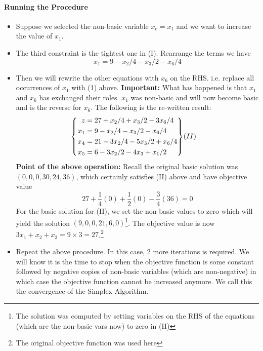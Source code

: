\documentclass[10pt]{article}
\newenvironment{rcases}
  {\left.\begin{aligned}}
  {\end{aligned}\right\rbrace}
\begin{document}
\paragraph{Running the Procedure}
\begin{itemize}
    \item Suppose we selected the non-basic variable $x_e = x_1$ and we want to increase the value of $x_1$. 
    \item The third constraint is the tightest one in (I). Rearrange the terms we have 
        \begin{equation}
            x_1 = 9 - x_2/4 - x_3/2 - x_6/4
        \end{equation}
    \item Then we will rewrite the other equations with $x_6$ on the RHS. i.e. replace all occurrences of $x_1$ with (1) above. \textbf{Important:} What has happened is that $x_1$ and $x_6$ has exchanged their roles. $x_1$ was non-basic and will now become basic and is the reverse for $x_6$. The following is the re-written result:
        \begin{equation*}
            \begin{cases}
                \begin{rcases}
                z &= 27 + x_2/4 + x_3/2 - 3x_6 /4 \\
                x_1 &= 9 - x_2/4 - x_3/2 - x_6/4 \\
                x_4 &= 21 - 3x_2/4 - 5x_3/2 +  x_6/4 \\
                x_5 &= 6 - 3x_2/2 - 4x_3 + x_1/2 
                \end{rcases}
                (II)
            \end{cases}
        \end{equation*}
    \textbf{Point of the above operation:} Recall the original basic solution was $(0,0,0,30,24,36)$, which certainly satisfies (II) above and have objective value
        \begin{equation*}
            27 + \frac{1}{4}(0) + \frac{1}{2}(0) - \frac{3}{4}(36) = 0
        \end{equation*}
    For the basic solution for (II), we set the non-basic values to zero which will yield the solution $(9,0,0,21,6,0)$\footnote{The solution was computed by setting variables on the RHS of the equations (which are the non-basic vars now) to zero in (II)}. The objective value is now $3x_1+x_2 + x_3 = 9 \times 3 = 27$.\footnote{The original objective function was used here}
    \item Repeat the above procedure. In this case, 2 more iterations is required. We will know it is the time to stop when the objective function is some constant followed by negative copies of non-basic variables (which are non-negative) in which case the objective function cannot be increased anymore. We call this the convergence of the Simplex Algorithm.
\end{itemize}
  
\end{document}
